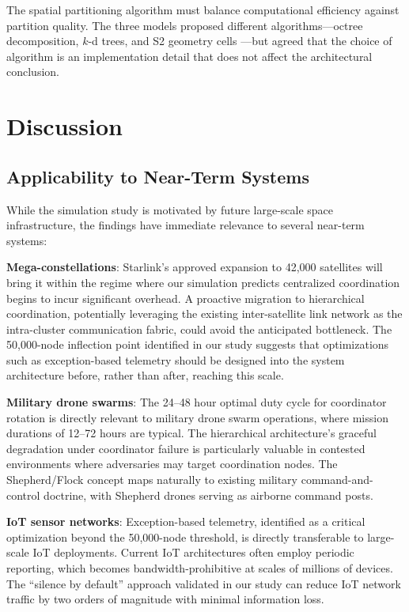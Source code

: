 \documentclass[journal]{IEEEtran}
\begin{document}
The spatial partitioning algorithm must balance computational efficiency against partition quality. The three models proposed different algorithms---octree decomposition, $k$-d trees, and S2 geometry cells \cite{s2geometry}---but agreed that the choice of algorithm is an implementation detail that does not affect the architectural conclusion.


\section{Discussion}

\subsection{Applicability to Near-Term Systems}

While the simulation study is motivated by future large-scale space infrastructure, the findings have immediate relevance to several near-term systems:

\textbf{Mega-constellations}: Starlink's approved expansion to 42{,}000 satellites will bring it within the regime where our simulation predicts centralized coordination begins to incur significant overhead. A proactive migration to hierarchical coordination, potentially leveraging the existing inter-satellite link network as the intra-cluster communication fabric, could avoid the anticipated bottleneck. The 50{,}000-node inflection point identified in our study suggests that optimizations such as exception-based telemetry should be designed into the system architecture before, rather than after, reaching this scale.

\textbf{Military drone swarms}: The 24--48 hour optimal duty cycle for coordinator rotation is directly relevant to military drone swarm operations, where mission durations of 12--72 hours are typical. The hierarchical architecture's graceful degradation under coordinator failure is particularly valuable in contested environments where adversaries may target coordination nodes. The Shepherd/Flock concept maps naturally to existing military command-and-control doctrine, with Shepherd drones serving as airborne command posts.

\textbf{IoT sensor networks}: Exception-based telemetry, identified as a critical optimization beyond the 50{,}000-node threshold, is directly transferable to large-scale IoT deployments. Current IoT architectures often employ periodic reporting, which becomes bandwidth-prohibitive at scales of millions of devices. The ``silence by default'' approach validated in our study can reduce IoT network traffic by two orders of magnitude with minimal information loss.
\end{document}
